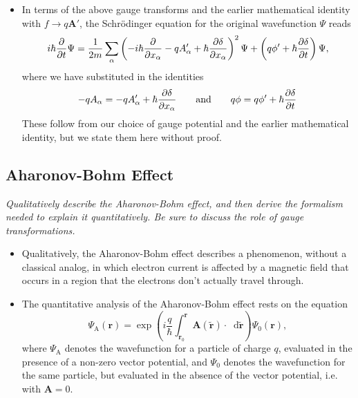 \documentclass[11pt, a4paper]{article}
\newcommand{\diff}{\mathop{}\!\mathrm{d}} %
\renewcommand{\grad}{\nabla}
\newcommand{\eqtext}[1]{\qquad \text{#1} \qquad}
\newcommand{\Schro}{Schr\"{o}dinger\xspace}
\renewcommand{\vec}[1]{\bm{#1}}  %
\renewcommand{\t}[1]{\tilde{#1}}
\renewcommand{\r}{\vec{r}}  %
\newcommand{\A}{\vec{A}}  %
\renewcommand{\P}{\Psi}  %
\begin{document}
\begin{itemize}
	Finally, to make the next steps more clear, we use $ \Psi'(\r, t) = e^{i \delta(\r, t)}\Psi(\r, t) $ to write the transformed \Schro equation in the form
    \begin{equation*}
        i \hbar \pdv{t} e^{i \delta(\r, t)}\Psi(\r, t) = \frac{(- i \hbar \grad - q \A')^{2}}{2m}e^{i\delta(\r, t)}\P(\r, t) + i \phi' e^{i\delta(\r, t)}\Psi(\r, t).
    \end{equation*}

	
	\item In terms of the above gauge transforms and the earlier mathematical identity with $ f \to q \A' $, the \Schro equation for the original wavefunction $ \P $ reads
	\begin{equation*}
		i\hbar \pdv{t}\P = \frac{1}{2m}\sum_{\alpha}\left(-i\hbar \pdv{x_{\alpha}} - q A'_{\alpha} + \hbar \pdv{\delta}{x_{\alpha}}\right)^{2} \P + \left(q\phi' + \hbar \pdv{\delta}{t}\right)\P,
	\end{equation*}
	where we have substituted in the identities
	\begin{equation*}
		-qA_{\alpha} = -qA'_{\alpha} + \hbar \pdv{\delta}{x_{\alpha}} \eqtext{and} q\phi = q\phi' + \hbar \pdv{\delta}{t} 
	\end{equation*}
	These follow from our choice of gauge potential and the earlier mathematical identity, but we state them here without proof.
	
\end{itemize}


\subsection{Aharonov-Bohm Effect}
\textit{Qualitatively describe the Aharonov-Bohm effect, and then derive the formalism needed to explain it quantitatively. Be sure to discuss the role of gauge transformations.}

\begin{itemize}
    \item Qualitatively, the Aharonov-Bohm effect describes a phenomenon, without a classical analog, in which electron current is affected by a magnetic field that occurs in a region that the electrons don't actually travel through.

	\item The quantitative analysis of the Aharonov-Bohm effect rests on the equation
	\begin{equation*}
		\P_{\text{A}}(\r) = \exp\left(i\frac{q}{\hbar} \int_{\r_{0}}^{\r}\A(\t{\r})\cdot \diff\t{\r}\right) \P_{0}(\r),
	\end{equation*}
    where $ \P_{\text{A}} $ denotes the wavefunction for a particle of charge $ q $, evaluated in the presence of a non-zero vector potential, and $ \P_{0} $ denotes the wavefunction for the same particle, but evaluated in the absence of the vector potential, i.e. with $ \A = 0 $.

\end{itemize}
\end{document}
